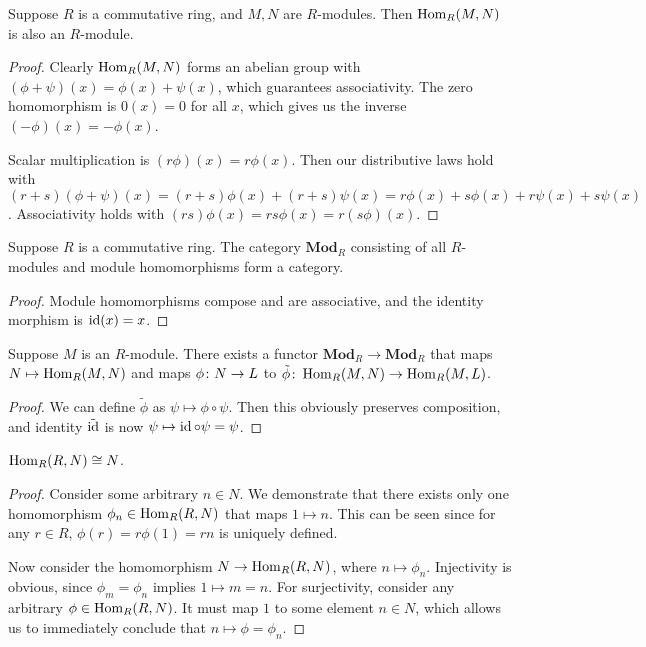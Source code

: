 \begin{proposition}
    Suppose \(R\) is a commutative ring, and \(M,N\) are \(R\)-modules.
    Then \(\operatorname{Hom}_R(M,N)\) is also an \(R\)-module.
\end{proposition}
\begin{proof}
    Clearly \(\operatorname{Hom}_R(M,N)\) forms an abelian group with
    \((\phi+\psi)(x) = \phi(x)+\psi(x)\),
    which guarantees associativity.
    The zero homomorphism is \(0(x) = 0\) for all \(x\),
    which gives us the inverse \((-\phi)(x) = -\phi(x)\).

    Scalar multiplication is \((r\phi)(x) = r\phi(x)\).
    Then our distributive laws hold with
    \((r+s)(\phi+\psi)(x) = (r+s)\phi(x) + (r+s)\psi(x) = r\phi(x) + s\phi(x) + r\psi(x) + s\psi(x)\).
    Associativity holds with \((rs)\phi(x) = rs\phi(x) = r(s\phi)(x)\).
\end{proof}
\begin{proposition}\label{prop:module-functor}
    Suppose \(R\) is a commutative ring.
    The category \(\textbf{Mod}_R\) consisting of all \(R\)-modules
    and module homomorphisms form a category.
\end{proposition}
\begin{proof}
    Module homomorphisms compose and are associative,
    and the identity morphism is \(\operatorname{id}(x) = x\).
\end{proof}
\begin{proposition}
    Suppose \(M\) is an \(R\)-module.
    There exists a functor \(\textbf{Mod}_R \to \textbf{Mod}_R\)
    that maps \(N \mapsto \operatorname{Hom}_R(M,N)\)
    and maps \(\phi\colon N\to L\) to \(\tilde{\phi}\colon\operatorname{Hom}_R(M,N)\to\operatorname{Hom}_R(M,L)\).
\end{proposition}
\begin{proof}
    We can define \(\tilde{\phi}\) as \(\psi \mapsto \phi\circ\psi\).
    Then this obviously preserves composition,
    and identity \(\tilde{\operatorname{id}}\) is now \(\psi \mapsto \operatorname{id}\circ\psi = \psi\).
\end{proof}
\begin{proposition}
    \(\operatorname{Hom}_R(R,N) \cong N\).
\end{proposition}
\begin{proof}
    Consider some arbitrary \(n \in N\).
    We demonstrate that there exists only one homomorphism \(\phi_n \in \operatorname{Hom}_R(R,N)\)
    that maps \(1 \mapsto n\).
    This can be seen since for any \(r \in R\),
    \(\phi(r) = r\phi(1) = rn\) is uniquely defined.

    Now consider the homomorphism \(N \to \operatorname{Hom}_R(R,N)\),
    where \(n \mapsto \phi_n\).
    Injectivity is obvious, since \(\phi_m = \phi_n\) implies \(1 \mapsto m = n\).
    For surjectivity, consider any arbitrary \(\phi \in \operatorname{Hom}_R(R,N)\).
    It must map \(1\) to some element \(n \in N\),
    which allows us to immediately conclude that \(n \mapsto \phi = \phi_n\).
\end{proof}

